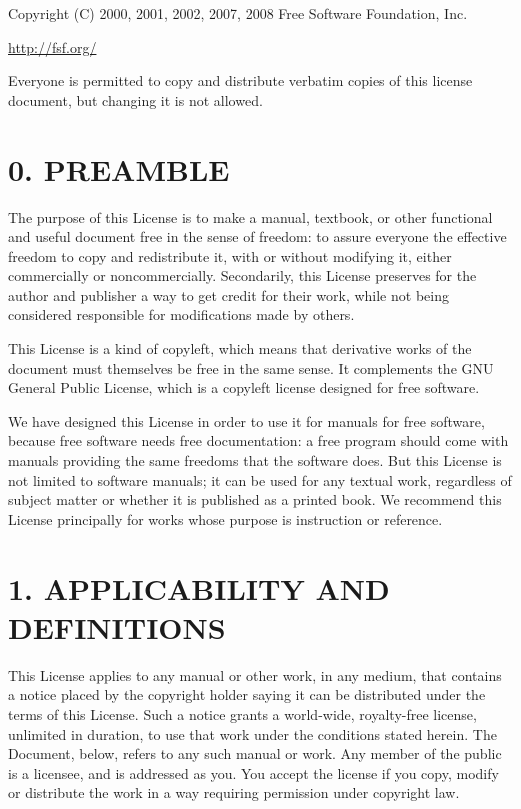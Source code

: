 \documentclass[captions=tableheading]{scrbook}
\begin{document}
\noindent Copyright (C) 2000, 2001, 2002, 2007, 2008 Free Software
Foundation, Inc.

\begin{center}
\url{http://fsf.org/}
\par\end{center}

\noindent Everyone is permitted to copy and distribute verbatim copies of this license document, but changing it is not allowed.
\section{0. PREAMBLE}
\label{sec-18-1}


The purpose of this License is to make a manual, textbook, or other functional and useful document free  in the sense of freedom: to assure everyone the effective freedom to copy and redistribute it, with or without modifying it, either commercially or noncommercially. Secondarily, this License preserves for the author and publisher a way to get credit for their work, while not being considered responsible for modifications made by others.

This License is a kind of copyleft, which means that derivative works of the document must themselves be free in the same sense. It complements the GNU General Public License, which is a copyleft license designed for free software.

We have designed this License in order to use it for manuals for free software, because free software needs free documentation: a free program should come with manuals providing the same freedoms that the software does. But this License is not limited to software manuals; it can be used for any textual work, regardless of subject matter or whether it is published as a printed book. We recommend this License principally for works whose purpose is instruction or reference.
\section{1. APPLICABILITY AND DEFINITIONS}
\label{sec-18-2}


This License applies to any manual or other work, in any medium, that contains a notice placed by the copyright holder saying it can be distributed under the terms of this License. Such a notice grants a world-wide, royalty-free license, unlimited in duration, to use that work under the conditions stated herein. The Document, below, refers to any such manual or work. Any member of the public is a licensee, and is addressed as you. You accept the license if you copy, modify or distribute the work in a way requiring permission under copyright law.
\end{document}
